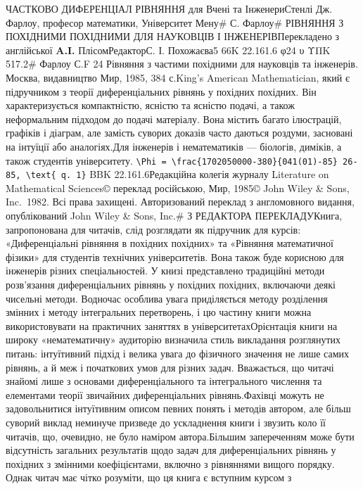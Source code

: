 \documentclass[
  ukrainian,
]{article}
\author{}
\date{}
\begin{document}
ЧАСТКОВО ДИФЕРЕНЦІАЛ РІВНЯННЯ для Вчені та ІнженериСтенлі Дж. Фарлоу,
професор математики, Університет Мену\# С. Фарлоу\# РІВНЯННЯ З ПОХІДНИМИ
ПОХІДНИМИ ДЛЯ НАУКОВЦІВ І ІНЖЕНЕРІВПерекладено з англійської
\textbf{A.I.} ПлісомРедакторС. І. Похожаєва5\textbar{} 66K 22.161.6 φ24
υ ΥΠΚ 517.2\# Фарлоу С.F 24 Рівняння з частими похідними для науковців
та інженерів. Москва, видавництво Мир, 1985, 384 с.King's American
Mathematician, який є підручником з теорії диференціальних рівнянь у
похідних похідних. Він характеризується компактністю, ясністю та ясністю
подачі, а також неформальним підходом до подачі матеріалу. Вона містить
багато ілюстрацій, графіків і діаграм, але замість суворих доказів часто
даються роздуми, засновані на інтуїції або аналогіях.Для інженерів і
нематематиків --- біологів, диміків, а також студентів університету.
\texttt{\textbackslash{}Phi\ =\ \textbackslash{}frac\{1702050000-380\}\{041(01)-85\}\ 26-85,\ \textbackslash{}text\{\ q.\ 1\}}
BBK 22.161.6Редакційна колегія журналу Literature on Mathematical
Sciences© переклад російською, Мир, 1985© John Wiley \& Sons, Inc.~1982.
Всі права захищені. Авторизований переклад з англомовного видання,
опублікований John Wiley \& Sons, Inc.\# З РЕДАКТОРА ПЕРЕКЛАДУКнига,
запропонована для читачів, слід розглядати як підручник для курсів:
«Диференціальні рівняння в похідних похідних» та «Рівняння математичної
фізики» для студентів технічних університетів. Вона також буде корисною
для інженерів різних спеціальностей. У книзі представлено традиційні
методи розв'язання диференціальних рівнянь у похідних похідних,
включаючи деякі чисельні методи. Водночас особлива увага приділяється
методу розділення змінних і методу інтегральних перетворень, і цю
частину книги можна використовувати на практичних заняттях в
університетахОрієнтація книги на широку «нематематичну» аудиторію
визначила стиль викладання розглянутих питань: інтуїтивний підхід і
велика увага до фізичного значення не лише самих рівнянь, а й меж і
початкових умов для різних задач. Вважається, що читачі знайомі лише з
основами диференціального та інтегрального числення та елементами теорії
звичайних диференціальних рівнянь.Фахівці можуть не задовольнитися
інтуїтивним описом певних понять і методів автором, але більш суворий
виклад неминуче призведе до ускладнення книги і звузить коло її читачів,
що, очевидно, не було наміром автора.Більшим запереченням може бути
відсутність загальних результатів щодо задач для диференціальних рівнянь
у похідних з змінними коефіцієнтами, включно з рівняннями вищого
порядку. Однак читач має чітко розуміти, що ця книга є вступним курсом з
\end{document}

